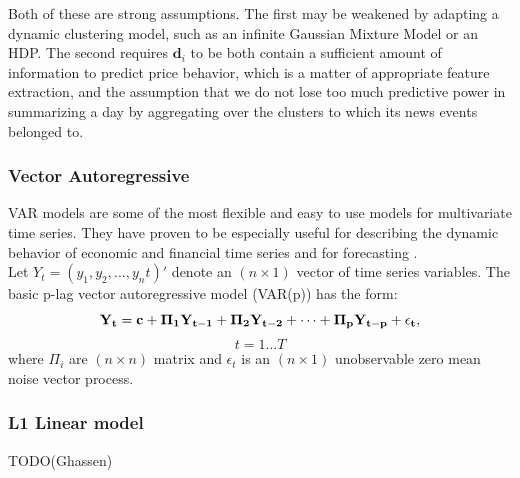 Both of these are strong assumptions. The first may be weakened by adapting a dynamic clustering model, such as an infinite Gaussian Mixture Model or an HDP. The second requires $\textbf{d}_i$ to be both contain a sufficient amount of information to predict price behavior, which is a matter of appropriate feature extraction, and the assumption that we do not lose too much predictive power in summarizing a day by aggregating over the clusters to which its news events belonged to.

\subsubsection{Vector Autoregressive}
VAR models are some of the most flexible and easy to use models for multivariate time series. They have proven to be especially useful for describing the dynamic behavior of economic and financial time series and for forecasting \cite{tsay, VAR}. \\
Let $Y_t = (y_1, y_2,...,y_nt)'$ denote an $(n \times 1)$ vector of time series variables. The basic p-lag vector autoregressive model (VAR(p)) has the form:
$$\bf{Y}_t=\bf{c}+\bf{\Pi}_1\bf{Y}_{t-1}+\bf{\Pi}_2\bf{Y}_{t-2}+\cdots+\bf{\Pi}_p\bf{Y}_{t-p}+\epsilon_t,$$ $$t=1\ldots T$$
where $\Pi_i$ are $(n \times n)$ matrix and $\epsilon_t$ is an $(n \times 1)$ unobservable zero mean noise vector process.

\subsubsection{L1 Linear model}

TODO(Ghassen)

